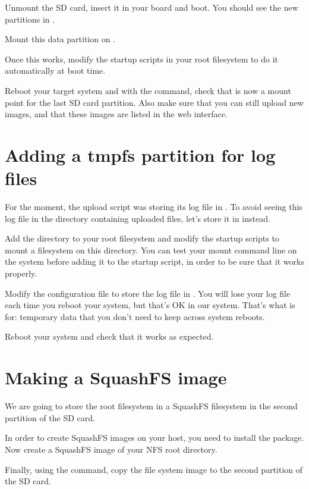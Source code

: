 Unmount the SD card, insert it in your board and boot. You should see the
new partitions in .

Mount this data partition on .

Once this works, modify the startup scripts in your root filesystem
to do it automatically at boot time.

Reboot your target system and with the  command, check that
 is now a mount point for the last SD card
partition. Also make sure that you can still upload new images, and
that these images are listed in the web interface.

\section{Adding a tmpfs partition for log files}

For the moment, the upload script was storing its log file in
. To avoid seeing this log file in
the directory containing uploaded files, let's store it in
 instead.

Add the  directory to your root filesystem and modify
the startup scripts to mount a  filesystem on this
directory. You can test your  mount command line on the
system before adding it to the startup script, in order to be sure
that it works properly.

Modify the  configuration file to store
the log file in . You will lose your log
file each time you reboot your system, but that's OK in our
system. That's what  is for: temporary data that you don't need
to keep across system reboots.

Reboot your system and check that it works as expected.

\section{Making a SquashFS image}

We are going to store the root filesystem in a SquashFS filesystem in
the second partition of the SD card.

In order to create SquashFS images on your host, you need to install
the  package. Now create a SquashFS image of your
NFS root directory.

Finally, using the  command, copy the file system image to
the second partition of the SD card.

